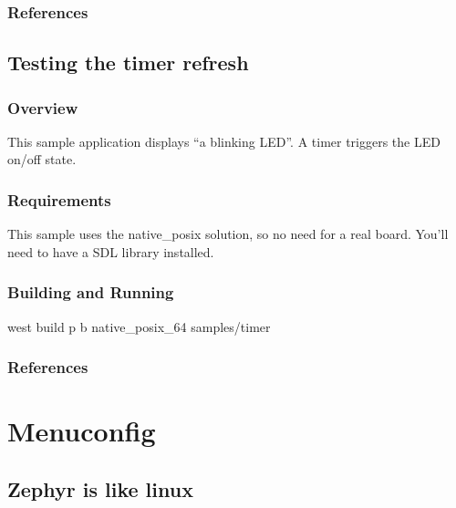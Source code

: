 \documentclass[letterpaper,10pt,english]{sphinxmanual}
\begin{document}
\subsection{References}
\label{\detokenize{samples/samplessdlbuttonREADME:references}}

\section{Testing the timer refresh}
\label{\detokenize{samples/samplestimerREADME:testing-the-timer-refresh}}\label{\detokenize{samples/samplestimerREADME:sdl-sample}}\label{\detokenize{samples/samplestimerREADME::doc}}

\subsection{Overview}
\label{\detokenize{samples/samplestimerREADME:overview}}
This sample application displays “a blinking LED”.
A timer triggers the LED on/off state.


\subsection{Requirements}
\label{\detokenize{samples/samplestimerREADME:requirements}}
This sample uses the native\_posix solution, so no need for a real board.
You’ll need to have a SDL library installed.


\subsection{Building and Running}
\label{\detokenize{samples/samplestimerREADME:building-and-running}}
west build \sphinxhyphen{}p \sphinxhyphen{}b native\_posix\_64 samples/timer


\subsection{References}
\label{\detokenize{samples/samplestimerREADME:references}}

\chapter{Menuconfig}
\label{\detokenize{menuconfig:menuconfig}}\label{\detokenize{menuconfig::doc}}

\section{Zephyr is like linux}
\label{\detokenize{menuconfig:zephyr-is-like-linux}}
\end{document}
